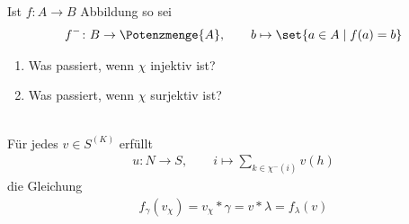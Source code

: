 \begin{notation}
	Ist $f\colon A\to B$ Abbildung so sei
	\begin{align*}
		f^-\colon B\to\Potenzmenge{A},\qquad
		b\mapsto\set{a\in A\mid f(a)=b}
	\end{align*}
\end{notation}

\begin{enumerate}
	\item Was passiert, wenn $\chi$ injektiv ist?
	\item Was passiert, wenn $\chi$ surjektiv ist?
\end{enumerate}

\\
Für jedes $v\in S^{(K)}$ erfüllt
\begin{align*}
	u\colon N\to S,\qquad
	i\mapsto\sum\limits_{k\in\chi^-(i)}v(h)
\end{align*}
die Gleichung
\begin{align}\label{eq080519}\tag{$*$}
	f_\gamma(v_\chi)=v_\chi*\gamma=v*\lambda=f_\lambda(v)
\end{align}

